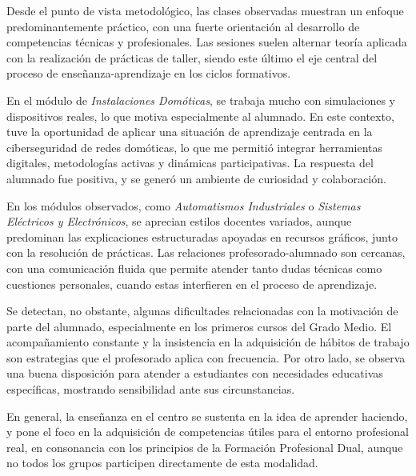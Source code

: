 Desde el punto de vista metodológico, las clases observadas muestran un enfoque predominantemente práctico, con una fuerte orientación al desarrollo de competencias técnicas y profesionales. Las sesiones suelen alternar teoría aplicada con la realización de prácticas de taller, siendo este último el eje central del proceso de enseñanza-aprendizaje en los ciclos formativos.

En el módulo de \textit{Instalaciones Domóticas}, se trabaja mucho con simulaciones y dispositivos reales, lo que motiva especialmente al alumnado. En este contexto, tuve la oportunidad de aplicar una situación de aprendizaje centrada en la ciberseguridad de redes domóticas, lo que me permitió integrar herramientas digitales, metodologías activas y dinámicas participativas. La respuesta del alumnado fue positiva, y se generó un ambiente de curiosidad y colaboración.

En los módulos observados, como \textit{Automatismos Industriales} o \textit{Sistemas Eléctricos y Electrónicos}, se aprecian estilos docentes variados, aunque predominan las explicaciones estructuradas apoyadas en recursos gráficos, junto con la resolución de prácticas. Las relaciones profesorado-alumnado son cercanas, con una comunicación fluida que permite atender tanto dudas técnicas como cuestiones personales, cuando estas interfieren en el proceso de aprendizaje.

Se detectan, no obstante, algunas dificultades relacionadas con la motivación de parte del alumnado, especialmente en los primeros cursos del Grado Medio. El acompañamiento constante y la insistencia en la adquisición de hábitos de trabajo son estrategias que el profesorado aplica con frecuencia. Por otro lado, se observa una buena disposición para atender a estudiantes con necesidades educativas específicas, mostrando sensibilidad ante sus circunstancias.

En general, la enseñanza en el centro se sustenta en la idea de aprender haciendo, y pone el foco en la adquisición de competencias útiles para el entorno profesional real, en consonancia con los principios de la Formación Profesional Dual, aunque no todos los grupos participen directamente de esta modalidad.
